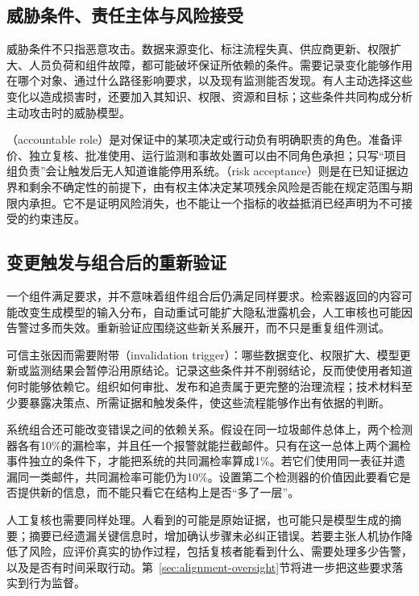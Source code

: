 \subsection{威胁条件、责任主体与风险接受}

威胁条件不只指恶意攻击。数据来源变化、标注流程失真、供应商更新、权限扩大、人员负荷和组件故障，都可能破坏保证所依赖的条件。需要记录变化能够作用在哪个对象、通过什么路径影响要求，以及现有监测能否发现。有人主动选择这些变化以造成损害时，还要加入其知识、权限、资源和目标；这些条件共同构成分析主动攻击时的威胁模型。

（accountable role）是对保证中的某项决定或行动负有明确职责的角色。准备评价、独立复核、批准使用、运行监测和事故处置可以由不同角色承担；只写“项目组负责”会让触发后无人知道谁能停用系统。（risk acceptance）则是在已知证据边界和剩余不确定性的前提下，由有权主体决定某项残余风险是否能在规定范围与期限内承担。它不是证明风险消失，也不能让一个指标的收益抵消已经声明为不可接受的约束违反。

\subsection{变更触发与组合后的重新验证}

一个组件满足要求，并不意味着组件组合后仍满足同样要求。检索器返回的内容可能改变生成模型的输入分布，自动重试可能扩大隐私泄露机会，人工审核也可能因告警过多而失效。重新验证应围绕这些新关系展开，而不只是重复组件测试。

可信主张因而需要附带（invalidation trigger）：哪些数据变化、权限扩大、模型更新或监测结果会暂停沿用原结论。记录这些条件并不削弱结论，反而使使用者知道何时能够依赖它。组织如何审批、发布和追责属于更完整的治理流程；技术材料至少要暴露决策点、所需证据和触发条件，使这些流程能够作出有依据的判断。

系统组合还可能改变错误之间的依赖关系。假设在同一垃圾邮件总体上，两个检测器各有10\%的漏检率，并且任一个报警就能拦截邮件。只有在这一总体上两个漏检事件独立的条件下，才能把系统的共同漏检率算成1\%。若它们使用同一表征并遗漏同一类邮件，共同漏检率可能仍为10\%。设置第二个检测器的价值因此要看它是否提供新的信息，而不能只看它在结构上是否“多了一层”。

人工复核也需要同样处理。人看到的可能是原始证据，也可能只是模型生成的摘要；摘要已经遗漏关键信息时，增加确认步骤未必纠正错误。若要主张人机协作降低了风险，应评价真实的协作过程，包括复核者能看到什么、需要处理多少告警，以及是否有时间采取行动。第~\ref{sec:alignment-oversight}节将进一步把这些要求落实到行为监督。


